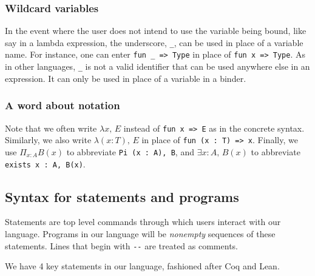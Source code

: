 \documentclass{article}
\begin{document}
\subsubsection{Wildcard variables}
In the event where the user does not intend to use the variable being bound,
like say in a lambda expression, the underscore, \verb|_|, can be used in place
of a variable name.
For instance, one can enter \verb|fun _ => Type| in place of \verb|fun x => Type|.
As in other languages, \verb|_| is not a valid identifier that can be used
anywhere else in an expression. It can only be used in place of a variable in a
binder.

\subsubsection{A word about notation}
Note that we often write $\lambda x, \, E$ instead of \verb|fun x => E| as in the
concrete syntax. Similarly, we also write $\lambda (x : T), \, E$ in place of
\verb|fun (x : T) => x|.
Finally, we use $\Pi_{x : A}B(x)$ to abbreviate 
\verb|Pi (x : A), B|, and
$\exists x : A, \, B(x)$ to abbreviate \verb|exists x : A, B(x)|.

\subsection{Syntax for statements and programs}
Statements are top level commands through which users interact with our
language. Programs in our language will be \textit{nonempty} sequences of
these statements. Lines that begin with \verb|--| are treated as comments.

We have 4 key statements in our language, fashioned after Coq and Lean.
\end{document}
